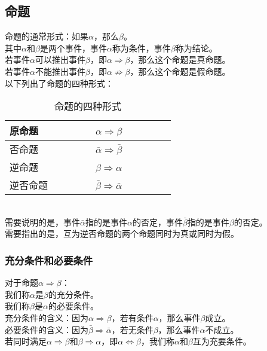 \documentclass[UTF8]{ctexart}
\begin{document}
\subsection{命题}
    命题的通常形式：如果$\alpha$，那么$\beta$。\\[3mm]
    其中$\alpha$和$\beta$是两个事件，事件$\alpha$称为条件，事件$\beta$称为结论。\\[3mm]
    若事件$\alpha$可以推出事件$\beta$，即$\alpha\Rightarrow\beta$，那么这个命题是真命题。\\[3mm]
    若事件$\alpha$不能推出事件$\beta$，即$\alpha\not\Rightarrow\beta$，那么这个命题是假命题。\\[6mm]
    以下列出了命题的四种形式：
    \begin{table}[h]
        \begin{center}
            \begin{tabular}{l|l}
                \hline
                原命题~~~~~~~~&$\alpha\Rightarrow\beta$~~~~~~~~\\ \hline
                否命题~~~~~~~~&$\bar{\alpha}\Rightarrow\bar{\beta}$~~~~~~~~\\ \hline
                逆命题~~~~~~~~&$\beta\Rightarrow\alpha$~~~~~~~~\\ \hline
                逆否命题~~~~~~~~&$\bar{\beta}\Rightarrow\bar{\alpha}$~~~~~~~~\\ \hline
            \end{tabular}
            \caption{命题的四种形式}
        \end{center}
    \end{table}\\
    需要说明的是，事件$\bar{\alpha}$指的是事件$\alpha$的否定，事件$\bar{\beta}$指的是事件$\beta$的否定。\\[3mm]
    需要指出的是，互为逆否命题的两个命题同时为真或同时为假。\\

\subsubsection{充分条件和必要条件}
    对于命题$\alpha\Rightarrow\beta$：\\[3mm]
    我们称$\alpha$是$\beta$的充分条件。\\[3mm]
    我们称$\beta$是$\alpha$的必要条件。\\[6mm]
    充分条件的含义：因为$\alpha\Rightarrow\beta$，若有条件$\alpha$，那么事件$\beta$成立。\\[3mm]
    必要条件的含义：因为$\bar{\beta}\Rightarrow\bar{\alpha}$，若无条件$\beta$，那么事件$\alpha$不成立。\\[6mm]
    若同时满足$\alpha\Rightarrow\beta$和$\beta\Rightarrow\alpha$，即$\alpha\Leftrightarrow\beta$，我们称$\alpha$和$\beta$互为充要条件。
\end{document}
